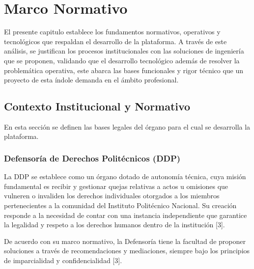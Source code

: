 
\chapter{Marco Normativo}
El presente capitulo establece los fundamentos normativos, operativos y tecnológicos que respaldan el desarrollo de la plataforma. A través de este análisis, se justifican los procesos institucionales con las soluciones de ingeniería que se proponen, validando que el desarrollo tecnológico además de resolver la problemática operativa, este abarca las bases funcionales y rigor técnico que un proyecto de esta índole demanda en el ámbito profesional.
\begin{flushleft}
\section{Contexto Institucional y Normativo}
\end{flushleft}
\justifying
En esta sección se definen las bases legales del órgano para el cual se desarrolla la plataforma.

\subsection{Defensoría de Derechos Politécnicos (DDP)}
La DDP se establece como un órgano dotado de autonomía técnica, cuya misión fundamental es recibir y gestionar quejas relativas a actos u omisiones que vulneren o invaliden los derechos individuales otorgados a los miembros pertenecientes a la comunidad del Instituto Politécnico Nacional. Su creación responde a la necesidad de contar con una instancia independiente que garantice la legalidad y respeto a los derechos humanos dentro de la institución [3].

De acuerdo con su marco normativo, la Defensoría tiene la facultad de proponer soluciones a través de recomendaciones y mediaciones, siempre bajo los principios de imparcialidad y confidencialidad [3].


